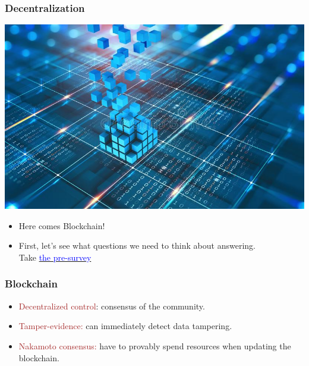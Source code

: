 \documentclass{beamer}
\begin{document}
\begin{frame}
  \frametitle{Decentralization}
  \centering 
  	\includegraphics[scale=1]{blockchain}
  	
  \begin{itemize}
 	\item  Here comes Blockchain! \\
  
 	\item  First, let's see what questions we need to think about answering. \\
	Take \href{https://forms.gle/BkPfQSLQhpNSNfkf6}{\textcolor{blue}{ the pre-survey}}
 \end{itemize}
\end{frame}
\begin{frame}
  \frametitle{Blockchain}
	\begin{itemize}
		\item \textcolor{brown}{Decentralized control}: consensus of the community.
		\item \textcolor{brown}{Tamper-evidence:} can immediately detect data tampering.
		\item \textcolor{brown}{Nakamoto consensus:} have to provably spend resources when updating the blockchain.
	\end{itemize}
\end{frame}
\end{document}

